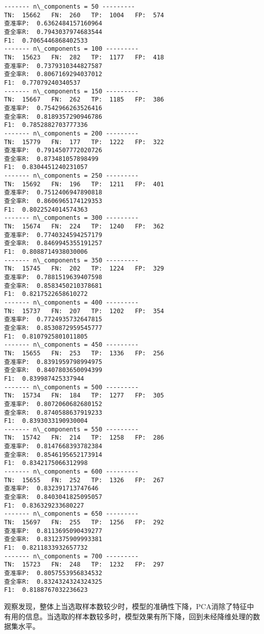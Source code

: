 \documentclass[11pt]{article}
\begin{document}
    \begin{Verbatim}[commandchars=\\\{\}]
------- n\_components = 50 ---------
TN:  15662   FN:  260   TP:  1004   FP:  574
查准率P:  0.6362484157160964
查全率R:  0.7943037974683544
F1:  0.7065446868402533
------- n\_components = 100 ---------
TN:  15623   FN:  282   TP:  1177   FP:  418
查准率P:  0.7379310344827587
查全率R:  0.8067169294037012
F1:  0.77079240340537
------- n\_components = 150 ---------
TN:  15667   FN:  262   TP:  1185   FP:  386
查准率P:  0.7542966263526416
查全率R:  0.8189357290946786
F1:  0.7852882703777336
------- n\_components = 200 ---------
TN:  15779   FN:  177   TP:  1222   FP:  322
查准率P:  0.7914507772020726
查全率R:  0.873481057898499
F1:  0.8304451240231057
------- n\_components = 250 ---------
TN:  15692   FN:  196   TP:  1211   FP:  401
查准率P:  0.7512406947890818
查全率R:  0.8606965174129353
F1:  0.8022524014574363
------- n\_components = 300 ---------
TN:  15674   FN:  224   TP:  1240   FP:  362
查准率P:  0.7740324594257179
查全率R:  0.8469945355191257
F1:  0.8088714938030006
------- n\_components = 350 ---------
TN:  15745   FN:  202   TP:  1224   FP:  329
查准率P:  0.7881519639407598
查全率R:  0.8583450210378681
F1:  0.8217522658610272
------- n\_components = 400 ---------
TN:  15737   FN:  207   TP:  1202   FP:  354
查准率P:  0.7724935732647815
查全率R:  0.8530872959545777
F1:  0.8107925801011805
------- n\_components = 450 ---------
TN:  15655   FN:  253   TP:  1336   FP:  256
查准率P:  0.8391959798994975
查全率R:  0.8407803650094399
F1:  0.839987425337944
------- n\_components = 500 ---------
TN:  15734   FN:  184   TP:  1277   FP:  305
查准率P:  0.8072060682680152
查全率R:  0.8740588637919233
F1:  0.8393033190930004
------- n\_components = 550 ---------
TN:  15742   FN:  214   TP:  1258   FP:  286
查准率P:  0.8147668393782384
查全率R:  0.8546195652173914
F1:  0.8342175066312998
------- n\_components = 600 ---------
TN:  15655   FN:  252   TP:  1326   FP:  267
查准率P:  0.832391713747646
查全率R:  0.8403041825095057
F1:  0.836329233680227
------- n\_components = 650 ---------
TN:  15697   FN:  255   TP:  1256   FP:  292
查准率P:  0.8113695090439277
查全率R:  0.8312375909993381
F1:  0.8211833932657732
------- n\_components = 700 ---------
TN:  15723   FN:  248   TP:  1232   FP:  297
查准率P:  0.8057553956834532
查全率R:  0.8324324324324325
F1:  0.8188767032236623
    \end{Verbatim}

    观察发现，整体上当选取样本数较少时，模型的准确性下降，PCA消除了特征中有用的信息。当选取的样本数较多时，模型效果有所下降，回到未经降维处理的数据集水平。


    
    
    
\end{document}

